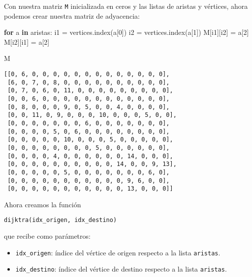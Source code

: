 \documentclass[
]{article}
\newenvironment{Shaded}{}{}
\newcommand{\ControlFlowTok}[1]{\textcolor[rgb]{0.00,0.44,0.13}{\textbf{#1}}}
\newcommand{\DecValTok}[1]{\textcolor[rgb]{0.25,0.63,0.44}{#1}}
\newcommand{\KeywordTok}[1]{\textcolor[rgb]{0.00,0.44,0.13}{\textbf{#1}}}
\newcommand{\NormalTok}[1]{#1}
\newcommand{\OperatorTok}[1]{\textcolor[rgb]{0.40,0.40,0.40}{#1}}
\begin{document}
Con nuestra matriz \texttt{M} inicializada en ceros y las listas de
aristas y vértices, ahora podemos crear nuestra matriz de adyacencia:

\begin{Shaded}
\begin{Highlighting}[]
\ControlFlowTok{for}\NormalTok{ a }\KeywordTok{in}\NormalTok{ aristas:}
\NormalTok{    i1 }\OperatorTok{=}\NormalTok{ vertices.index(a[}\DecValTok{0}\NormalTok{])}
\NormalTok{    i2 }\OperatorTok{=}\NormalTok{ vertices.index(a[}\DecValTok{1}\NormalTok{])}
\NormalTok{    M[i1][i2] }\OperatorTok{=}\NormalTok{ a[}\DecValTok{2}\NormalTok{]}
\NormalTok{    M[i2][i1] }\OperatorTok{=}\NormalTok{ a[}\DecValTok{2}\NormalTok{]}
\end{Highlighting}
\end{Shaded}

\begin{Shaded}
\begin{Highlighting}[]
\NormalTok{M}
\end{Highlighting}
\end{Shaded}

\begin{verbatim}
[[0, 6, 0, 0, 0, 0, 0, 0, 0, 0, 0, 0, 0, 0, 0],
 [6, 0, 7, 0, 8, 0, 0, 0, 0, 0, 0, 0, 0, 0, 0],
 [0, 7, 0, 6, 0, 11, 0, 0, 0, 0, 0, 0, 0, 0, 0],
 [0, 0, 6, 0, 0, 0, 0, 0, 0, 0, 0, 0, 0, 0, 0],
 [0, 8, 0, 0, 0, 9, 0, 5, 0, 0, 4, 0, 0, 0, 0],
 [0, 0, 11, 0, 9, 0, 0, 0, 10, 0, 0, 0, 5, 0, 0],
 [0, 0, 0, 0, 0, 0, 0, 6, 0, 0, 0, 0, 0, 0, 0],
 [0, 0, 0, 0, 5, 0, 6, 0, 0, 0, 0, 0, 0, 0, 0],
 [0, 0, 0, 0, 0, 10, 0, 0, 0, 5, 0, 0, 0, 0, 0],
 [0, 0, 0, 0, 0, 0, 0, 0, 5, 0, 0, 0, 0, 0, 0],
 [0, 0, 0, 0, 4, 0, 0, 0, 0, 0, 0, 14, 0, 0, 0],
 [0, 0, 0, 0, 0, 0, 0, 0, 0, 0, 14, 0, 0, 9, 13],
 [0, 0, 0, 0, 0, 5, 0, 0, 0, 0, 0, 0, 0, 6, 0],
 [0, 0, 0, 0, 0, 0, 0, 0, 0, 0, 0, 9, 6, 0, 0],
 [0, 0, 0, 0, 0, 0, 0, 0, 0, 0, 0, 13, 0, 0, 0]]
\end{verbatim}

Ahora creamos la función

\texttt{dijktra(idx\_origen,\ idx\_destino)}

que recibe como parámetros:

\begin{itemize}
\item
  \texttt{idx\_origen}: índice del vértice de origen respecto a la lista
  \texttt{aristas}.
\item
  \texttt{idx\_destino}: índice del vértice de destino respecto a la
  lista \texttt{aristas}.
\end{itemize}
\end{document}
